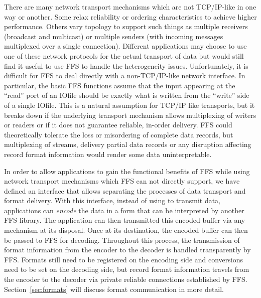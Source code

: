 There are many network transport mechanisms which are not TCP/IP-like in one
way or another.  Some relax reliability or ordering characteristics to achieve
higher performance.  Others vary topology to support such things as multiple
receivers (broadcast and multicast) or multiple senders (with incoming
messages multiplexed over a single connection).  Different applications may
choose to use one of these network protocols for the actual transport of data
but would still find it useful to use FFS to handle the heterogeneity issues.
Unfortunately, it is difficult for FFS to deal directly with a
non-TCP/IP-like network interface.  In particular, the basic FFS functions
assume that the input appearing at the ``read'' port of an IOfile should be
exactly what is written from the ``write'' side of a single IOfile.  This is a
natural assumption for TCP/IP like transports, but it breaks down if the
underlying transport mechanism allows multiplexing of writers or readers or if
it does not guarantee reliable, in-order delivery.  FFS could theoretically
tolerate the loss or misordering of complete data records, but multiplexing of
streams, delivery partial data records or any disruption affecting record
format information would render some data uninterpretable. 

In order to allow applications to gain the functional benefits of FFS while
using network transport mechanisms which FFS can not directly support, we
have defined an interface that allows separating the processes of data
transport and format delivery.  With this interface, instead of using
 to transmit data, applications can {\em encode} the data in
a form that can be interpreted by another FFS library.  The application can
then transmitted this encoded buffer via any mechanism at its disposal.  Once
at its destination, the encoded buffer can then be passed to FFS for decoding.
Throughout this process, the transmission of format information from the
encoder to the decoder is handled transparently by FFS.  Formats still need
to be registered on the encoding side and conversions need to be set on the
decoding side, but record format information travels from the encoder to the
decoder via private reliable connections established by FFS.
Section~\ref{sec:formats} will discuss format communication in more detail.

